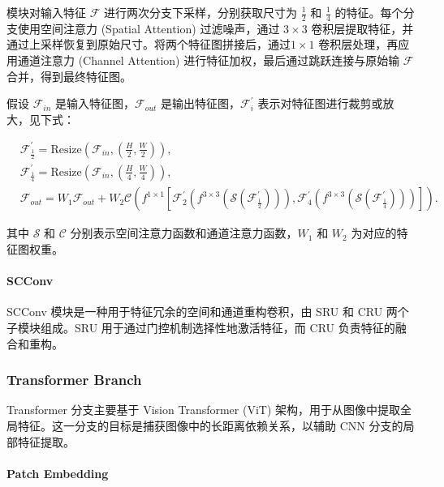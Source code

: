 \documentclass[a4paper, 10pt]{article}
\begin{document}
		模块对输入特征 $\mathcal{F}$ 进行两次分支下采样，分别获取尺寸为 $\frac{1}{2}$ 和 $\frac{1}{4}$ 的特征。每个分支使用空间注意力 (Spatial Attention) 过滤噪声，通过 $3 \times 3$ 卷积层提取特征，并通过上采样恢复到原始尺寸。将两个特征图拼接后，通过$ 1 \times 1$ 卷积层处理，再应用通道注意力 (Channel Attention) 进行特征加权，最后通过跳跃连接与原始输 $\mathcal{F}$ 合并，得到最终特征图。
		
		假设 $\mathcal{F}_{in}$ 是输入特征图，$\mathcal{F}_{out}$ 是输出特征图，$\mathcal{F}_{i}^\prime$ 表示对特征图进行裁剪或放大，见下式：
		
		\begin{equation}
			\begin{aligned}
				&\mathcal{F}^\prime_{\frac{1}{2}} = \text{Resize}\left(\mathcal{F}_{in},\left(\frac{H}{2},\frac{W}{2}\right)\right), \\
				&\mathcal{F}^\prime_{\frac{1}{4}} = \text{Resize}\left(\mathcal{F}_{in},\left(\frac{H}{4},\frac{W}{4}\right)\right), \\
				&\mathcal{F}_{out} = W_1\mathcal{F}_{out} + W_2\mathcal{C} \left( f^{1 \times 1}  \left[\mathcal{F}^\prime_2 (f^{3 \times 3}(\mathcal{S}(\mathcal{F}^\prime_{\frac{1}{2}}))), \mathcal{F}^\prime_4 (f^{3 \times 3}(\mathcal{S}(\mathcal{F}^\prime_{\frac{1}{4}})))\right] \right).
			\end{aligned}
			\label{eq: ARMB}
		\end{equation}
		
		其中 $\mathcal{S}$ 和 $\mathcal{C}$ 分别表示空间注意力函数和通道注意力函数，$W_1$ 和 $W_2$ 为对应的特征图权重。
		
		\paragraph{SCConv}
		
		SCConv 模块是一种用于特征冗余的空间和通道重构卷积，由 SRU 和 CRU 两个子模块组成。SRU 用于通过门控机制选择性地激活特征，而 CRU 负责特征的融合和重构。
		
		\subsubsection{Transformer Branch}
		
		Transformer 分支主要基于 Vision Transformer (ViT) 架构，用于从图像中提取全局特征。这一分支的目标是捕获图像中的长距离依赖关系，以辅助 CNN 分支的局部特征提取。
		
		\paragraph{Patch Embedding}
		
\end{document}
